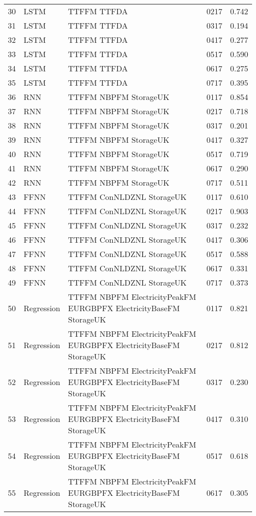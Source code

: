 \begin{table}[ht]
\begin{tabular}{rlllr}
  30 & LSTM & TTFFM TTFDA & 0217 & 0.742 \\ 
  31 & LSTM & TTFFM TTFDA & 0317 & 0.194 \\ 
  32 & LSTM & TTFFM TTFDA & 0417 & 0.277 \\ 
  33 & LSTM & TTFFM TTFDA & 0517 & 0.590 \\ 
  34 & LSTM & TTFFM TTFDA & 0617 & 0.275 \\ 
  35 & LSTM & TTFFM TTFDA & 0717 & 0.395 \\ 
  36 & RNN & TTFFM NBPFM StorageUK & 0117 & 0.854 \\ 
  37 & RNN & TTFFM NBPFM StorageUK & 0217 & 0.718 \\ 
  38 & RNN & TTFFM NBPFM StorageUK & 0317 & 0.201 \\ 
  39 & RNN & TTFFM NBPFM StorageUK & 0417 & 0.327 \\ 
  40 & RNN & TTFFM NBPFM StorageUK & 0517 & 0.719 \\ 
  41 & RNN & TTFFM NBPFM StorageUK & 0617 & 0.290 \\ 
  42 & RNN & TTFFM NBPFM StorageUK & 0717 & 0.511 \\ 
  43 & FFNN & TTFFM ConNLDZNL StorageUK & 0117 & 0.610 \\ 
  44 & FFNN & TTFFM ConNLDZNL StorageUK & 0217 & 0.903 \\ 
  45 & FFNN & TTFFM ConNLDZNL StorageUK & 0317 & 0.232 \\ 
  46 & FFNN & TTFFM ConNLDZNL StorageUK & 0417 & 0.306 \\ 
  47 & FFNN & TTFFM ConNLDZNL StorageUK & 0517 & 0.588 \\ 
  48 & FFNN & TTFFM ConNLDZNL StorageUK & 0617 & 0.331 \\ 
  49 & FFNN & TTFFM ConNLDZNL StorageUK & 0717 & 0.373 \\ 
  50 & Regression & TTFFM NBPFM ElectricityPeakFM EURGBPFX ElectricityBaseFM StorageUK & 0117 & 0.821 \\ 
  51 & Regression & TTFFM NBPFM ElectricityPeakFM EURGBPFX ElectricityBaseFM StorageUK & 0217 & 0.812 \\ 
  52 & Regression & TTFFM NBPFM ElectricityPeakFM EURGBPFX ElectricityBaseFM StorageUK & 0317 & 0.230 \\ 
  53 & Regression & TTFFM NBPFM ElectricityPeakFM EURGBPFX ElectricityBaseFM StorageUK & 0417 & 0.310 \\ 
  54 & Regression & TTFFM NBPFM ElectricityPeakFM EURGBPFX ElectricityBaseFM StorageUK & 0517 & 0.618 \\ 
  55 & Regression & TTFFM NBPFM ElectricityPeakFM EURGBPFX ElectricityBaseFM StorageUK & 0617 & 0.305 \\ 

\end{tabular}
\end{table}
